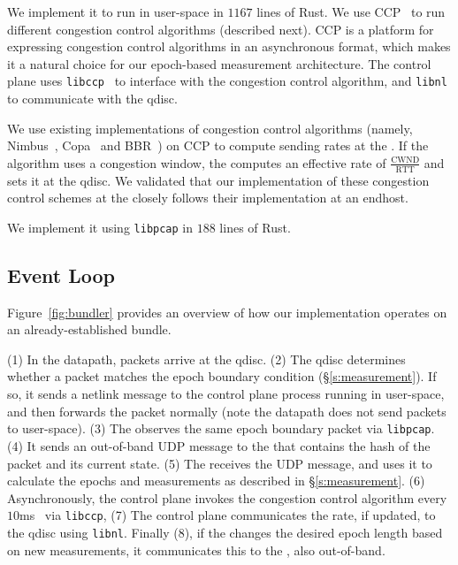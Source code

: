  We implement it to run in user-space in $1167$ lines of Rust.
We use CCP~\cite{ccp} to run different congestion control algorithms (described next). 
CCP is a platform for expressing congestion control algorithms in an asynchronous format, which makes it a natural choice for our epoch-based measurement architecture. 
The control plane uses \texttt{libccp}~\cite{ccp} to interface with the congestion control algorithm, and  \texttt{libnl} to communicate with the qdisc.

 We use existing implementations of congestion control algorithms (namely, Nimbus~\cite{nimbus}, Copa~\cite{copa} and BBR~\cite{bbr}) on CCP to compute sending rates at the \inbox.  If the algorithm uses a congestion window, the \inbox computes an effective rate of $\frac{\text{CWND}}{\text{RTT}}$ and sets it at the qdisc. 
We validated that our implementation of these congestion control schemes at the \inbox closely follows their implementation at an endhost.

\Para{\capoutbox} We implement it using \texttt{libpcap} in $188$ lines of Rust. 

\subsection{\name Event Loop}\label{s:impl:loop}
Figure~\ref{fig:bundler} provides an overview of how our \name implementation operates on an already-established bundle.

(1) In the datapath, packets arrive at the \inbox qdisc.
(2) The qdisc determines whether a packet matches the epoch boundary condition (\S\ref{s:measurement}). 
If so, it sends a netlink message to the control plane process running in user-space, and then forwards the packet normally (note the datapath does not send packets to user-space). 
(3) The \outbox observes the same epoch boundary packet via \texttt{libpcap}.
(4) It sends an out-of-band UDP message to the \inbox that contains the hash of the packet and its current state. 
(5) The \inbox receives the UDP message, and uses it to calculate the epochs and measurements as described 
in \S\ref{s:measurement}. 
(6) Asynchronously, the \inbox control plane invokes the congestion control algorithm every $10$ms~\cite{ccp}
via \texttt{libccp},
(7) The \inbox control plane communicates the rate, if updated, to the qdisc
using \texttt{libnl}. 
Finally (8), if the \inbox changes the desired epoch length based on new measurements, it communicates this to the \outbox, also out-of-band.
